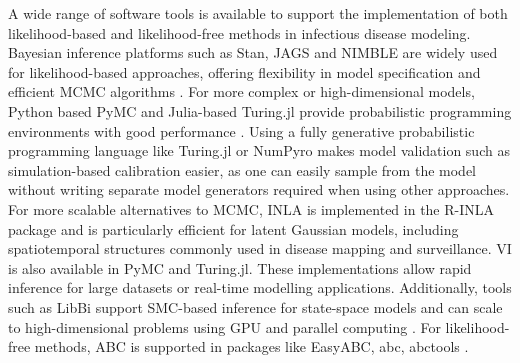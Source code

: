 \documentclass{article}
\begin{document}
A wide range of software tools is available to support the implementation of both likelihood-based and likelihood-free methods in infectious disease modeling. Bayesian inference platforms such as Stan, JAGS and NIMBLE are widely used for likelihood-based approaches, offering flexibility in model specification and efficient MCMC algorithms \citep{carpenter2017stan,abril2023pymc}. For more complex or high-dimensional models, Python based PyMC and Julia-based Turing.jl provide probabilistic programming environments with good performance \citep{abril2023pymc,ge2018turing,fjelde2025turing}. Using a fully generative probabilistic programming language like Turing.jl or NumPyro makes model validation such as simulation-based calibration easier, as one can easily sample from the model without writing separate model generators required when using other approaches. For more scalable alternatives to MCMC, INLA is implemented in the R-INLA package \citep{martins2013bayesian} and is particularly efficient for latent Gaussian models, including spatiotemporal structures commonly used in disease mapping and surveillance. VI is also available in PyMC and Turing.jl. These implementations allow rapid inference for large datasets or real-time modelling applications.  Additionally, tools such as LibBi support SMC-based inference for state-space models and can scale to high-dimensional problems using GPU and parallel computing \citep{murray2015bayesian}. For likelihood-free methods, ABC is supported in packages like EasyABC, abc, abctools \citep{jabot2013easy,csillery2012abc,nunes2015abctools}.
\end{document}
